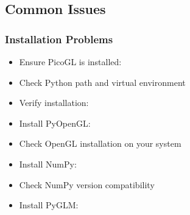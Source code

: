 \documentclass[a4paper,10pt,english,openany,oneside]{sphinxmanual}
\begin{document}
\subsection{Common Issues}
\label{\detokenize{troubleshooting:common-issues}}

\subsubsection{Installation Problems}
\label{\detokenize{troubleshooting:installation-problems}}\begin{description}
\begin{itemize}
\item {} 
\sphinxAtStartPar
Ensure PicoGL is installed: 

\item {} 
\sphinxAtStartPar
Check Python path and virtual environment

\item {} 
\sphinxAtStartPar
Verify installation: 

\end{itemize}

\begin{itemize}
\item {} 
\sphinxAtStartPar
Install PyOpenGL: 

\item {} 
\sphinxAtStartPar
Check OpenGL installation on your system

\end{itemize}

\begin{itemize}
\item {} 
\sphinxAtStartPar
Install NumPy: 

\item {} 
\sphinxAtStartPar
Check NumPy version compatibility

\end{itemize}

\begin{itemize}
\item {} 
\sphinxAtStartPar
Install PyGLM: 


\end{itemize}
\end{description}
\end{document}
